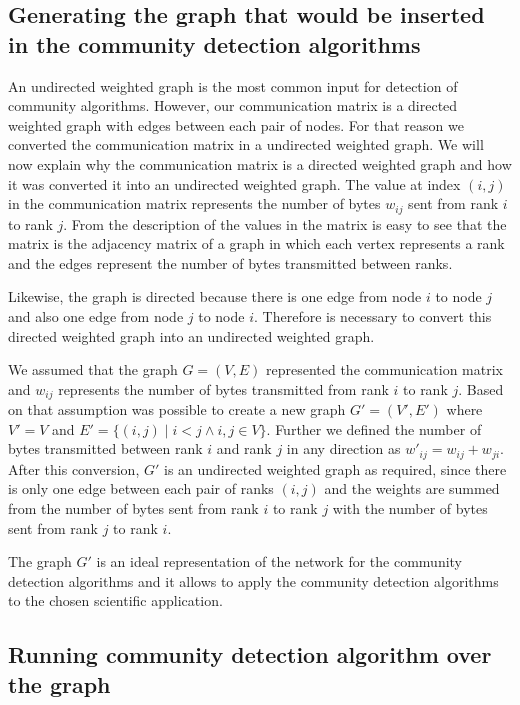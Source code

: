 \documentclass[journal]{IEEEtran}
\begin{document}
\begin{NoHyper}
\subsection{Generating the graph that would be inserted in the community detection algorithms}

An undirected weighted graph is the most common input for detection of community algorithms. However, our communication matrix is a directed weighted graph with edges between each pair of nodes. For that reason we converted the communication matrix in a undirected weighted graph. We will now explain why the communication matrix is a directed weighted graph and how it was converted it into an undirected weighted graph. The value at index $(i,j)$ in the communication matrix represents the number of bytes $w_{ij}$ sent from rank $i$ to rank $j$. From the description of the values in the matrix is easy to see that the matrix is the adjacency matrix of a graph in which each vertex represents a rank and the edges represent the number of bytes transmitted between ranks.

Likewise, the graph is directed because there is one edge from node $i$ to node $j$ and also one edge from node $j$ to node $i$. Therefore is necessary to convert this directed weighted graph into an undirected weighted graph.

We assumed that the graph $G=(V,E)$ represented the communication matrix and $w_{ij}$ represents the number of bytes transmitted from rank $i$ to rank $j$. Based on that assumption was possible to create a new graph $G'=(V',E')$ where $V'=V$ and $E' = \{(i,j) \mid i < j \wedge i , j \in V\}$. Further we defined the number of bytes transmitted between rank $i$ and rank $j$ in any direction as $w'_{ij}=w_{ij} + w_{ji}$. After this conversion, $G'$ is an undirected weighted graph as required, since there is only one edge between each pair of ranks $(i,j)$ and the weights are summed from the number of bytes sent from rank $i$ to rank $j$ with the number of bytes sent from rank $j$ to rank $i$.

The graph $G'$ is an ideal representation of the network for the community detection algorithms and it allows to apply the community detection algorithms to the chosen scientific application.


\subsection{Running community detection algorithm over the graph}


\end{NoHyper}
\end{document}
